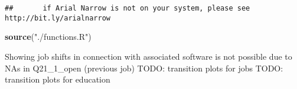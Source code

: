 \documentclass[]{article}
\newenvironment{Shaded}{\begin{snugshade}}{\end{snugshade}}
\newcommand{\KeywordTok}[1]{\textcolor[rgb]{0.13,0.29,0.53}{\textbf{{#1}}}}
\newcommand{\StringTok}[1]{\textcolor[rgb]{0.31,0.60,0.02}{{#1}}}
\newcommand{\NormalTok}[1]{{#1}}
\begin{document}
\begin{verbatim}
##       if Arial Narrow is not on your system, please see http://bit.ly/arialnarrow
\end{verbatim}

\begin{Shaded}
\begin{Highlighting}[]
\KeywordTok{source}\NormalTok{(}\StringTok{"./functions.R"}\NormalTok{)}
\end{Highlighting}
\end{Shaded}

Showing job shifts in connection with associated software is not
possible due to NAs in Q21\_1\_open (previous job) TODO: transition
plots for jobs TODO: transition plots for education

\begin{Shaded}
\end{Shaded}
\end{document}
